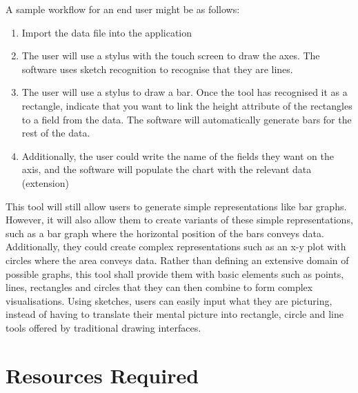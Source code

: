 A sample workflow for an end user might be as follows:
\begin{enumerate}
  \item Import the data file into the application
  \item The user will use a stylus with the touch screen to draw the axes. The software uses sketch recognition to recognise that they are lines.
  \item The user will use a stylus to draw a bar. Once the tool has recognised it as a rectangle, indicate that you want to link the height attribute of the rectangles to a field from the data. The software will automatically generate bars for the rest of the data.
  \item Additionally, the user could write the name of the fields they want on the axis, and the software will populate the chart with the relevant data (extension)
\end{enumerate}

This tool will still allow users to generate simple representations like bar graphs. However, it will also allow them to create variants of these simple representations, such as a bar graph where the horizontal position of the bars conveys data. Additionally, they could create complex representations such as an x-y plot with circles where the area conveys data. Rather than defining an extensive domain of possible graphs, this tool shall provide them with basic elements such as points, lines, rectangles and circles that they can then combine to form complex visualisations. Using sketches, users can easily input what they are picturing, instead of having to translate their mental picture into rectangle, circle and line tools offered by traditional drawing interfaces.

\clearpage









\section*{Resources Required}

